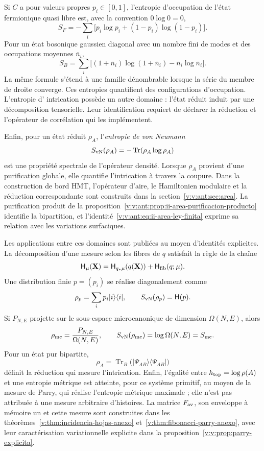 Si \(C\) a pour valeurs propres \(p_i\in[0,1]\), l’entropie d’occupation de
l’état fermionique quasi libre est, avec la convention \(0\log0=0\),
\begin{equation}
 S_F=-\sum_i\bigl[p_i\log p_i+(1-p_i)\log(1-p_i)\bigr].
 \label{v:v:rec:eq:entropia-cuasilibre-fermi-rev3}
\end{equation}
Pour un état bosonique gaussien diagonal avec un nombre fini de modes et
des occupations moyennes \(\overline n_i\),
\begin{equation}
 S_B=\sum_i\bigl[(1+\overline n_i)\log(1+\overline n_i)
                  -\overline n_i\log\overline n_i\bigr].
 \label{v:v:rec:eq:entropia-gaussiana-bose-rev3}
\end{equation}
La même formule s'étend à une famille dénombrable lorsque la série du
membre de droite converge.
Ces entropies quantifient des configurations d'occupation. L'entropie d'
intrication possède un autre domaine : l'état réduit induit par une
décomposition tensorielle. Leur identification requiert de déclarer la
réduction et l'opérateur de corrélation qui les implémentent.

Enfin, pour un état réduit \(\rho_A\), l’\emph{entropie de von
Neumann}
\[
 S_{\rm vN}(\rho_A)=-\operatorname{Tr}(\rho_A\log\rho_A)
\]
est une propriété spectrale de l’opérateur densité. Lorsque \(\rho_A\)
provient d’une purification globale, elle quantifie l’intrication à travers
la coupure. Dans la construction de bord HMT, l’opérateur d’aire, le
Hamiltonien modulaire et la réduction correspondante sont construits dans la
section~\ref{v:v:ant:sec:area}. La purification produit de la
proposition~\ref{v:v:ant:prop:ii-area-purificacion-producto} identifie
la bipartition, et l’identité~\eqref{v:v:ant:eq:ii-area-ley-finita}
exprime sa relation avec les variations surfaciques.

\newpage
Les applications entre ces domaines sont publiées au moyen d’identités explicites.
La décomposition d’une mesure selon les fibres de \(q\) satisfait la règle de
la chaîne
\begin{equation}
 \mathsf H_\mu(\mathbf X)
 =\mathsf H_{q_*\mu}(q(\mathbf X))
  +\mathsf H_{\rm fib}(q;\mu).
 \label{v:v:rec:eq:cadena-entropia-fibras-rev2}
\end{equation}
Une distribution finie \(p=(p_i)\) se réalise diagonalement comme
\[
 \rho_p=\sum_i p_i|i\rangle\langle i|,
 \qquad S_{\rm vN}(\rho_p)=\mathsf H(p).
\]
Si \(P_{N,E}\) projette sur le sous-espace microcanonique de dimension
\(\Omega(N,E)\), alors
\[
 \rho_{\rm mc}=\frac{P_{N,E}}{\Omega(N,E)},
 \qquad S_{\rm vN}(\rho_{\rm mc})=\log\Omega(N,E)=S_{\rm mc}.
\]
Pour un état pur bipartite,
\[
 \rho_A=\operatorname{Tr}_B
 \bigl(|\Psi_{AB}\rangle\langle\Psi_{AB}|\bigr)
\]
définit la réduction qui mesure l’intrication. Enfin, l’égalité entre
\(h_{\rm top}=\log\rho(A)\) et une entropie métrique est atteinte, pour ce
système primitif, au moyen de la mesure de Parry, qui réalise l’entropie métrique
maximale ; elle n’est pas attribuée à une mesure arbitraire d’histoires. La matrice
\(F_{\rm av}\), son enveloppe à mémoire un et cette mesure sont
construites dans les théorèmes~\ref{v:thm:incidencia-hojas-anexo}
et~\ref{v:thm:fibonacci-parry-anexo}, avec leur caractérisation variationnelle
explicite dans la proposition~\ref{v:v:prop:parry-explicita}.
